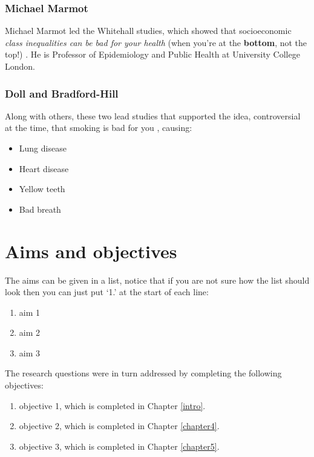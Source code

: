 \documentclass[12pt,]{book}
\providecommand{\tightlist}{%
  \setlength{\itemsep}{0pt}\setlength{\parskip}{0pt}}
\begin{document}
\hypertarget{michael-marmot}{%
\subsection{Michael Marmot}\label{michael-marmot}}

Michael Marmot led the Whitehall studies, which showed that socioeconomic \emph{class inequalities can be bad for your health} (when you're at the \textbf{bottom}, not the top!) \citep{Marmot:1991}.
He is Professor of Epidemiology and Public Health at University College London.

\hypertarget{doll-and-bradford-hill}{%
\subsection{Doll and Bradford-Hill}\label{doll-and-bradford-hill}}

Along with others, these two lead studies that supported the idea, controversial at the time, that smoking is bad for you \citep{Doll:1950}, causing:

\begin{itemize}
\tightlist
\item
  Lung disease
\item
  Heart disease
\item
  Yellow teeth
\item
  Bad breath
\end{itemize}

\hypertarget{aims-and-objectives}{%
\chapter{Aims and objectives}\label{aims-and-objectives}}

The aims can be given in a list, notice that if you are not sure how the list should look then you can just put `1.' at the start of each line:

\begin{enumerate}
\def\labelenumi{\arabic{enumi}.}
\tightlist
\item
  aim 1
\item
  aim 2
\item
  aim 3
\end{enumerate}

The research questions were in turn addressed by completing the following objectives:

\begin{enumerate}
\def\labelenumi{\arabic{enumi}.}
\tightlist
\item
  objective 1, which is completed in Chapter \ref{intro}.
\item
  objective 2, which is completed in Chapter \ref{chapter4}.
\item
  objective 3, which is completed in Chapter \ref{chapter5}.
\end{enumerate}
\end{document}
